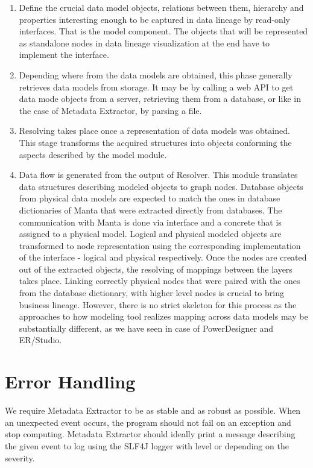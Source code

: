 \begin{enumerate}
	\item Define the crucial data model objects, relations between them, hierarchy and properties interesting enough to be captured in data lineage by read-only interfaces. That is the model component. 
	The objects that will be represented as standalone nodes in data lineage visualization at the end have to implement the  interface.
	\item Depending where from the data models are obtained, this phase generally retrieves data models from storage. It may be by calling a web API to get data mode objects from a server, retrieving them from a database, or like in the case of Metadata Extractor, by parsing a file.
	\item Resolving takes place once a representation of data models was obtained. This stage transforms the acquired structures into objects conforming the aspects described by the model module.
	\item Data flow is generated from the output of Resolver. This module translates data structures describing modeled objects to graph nodes. 
	Database objects from physical data models are expected to match the ones in database dictionaries of Manta that were extracted directly from databases. 
	The communication with Manta is done via  interface and a concrete  that is assigned to a physical model.
	Logical and physical modeled objects are transformed to node representation using the corresponding implementation of the  interface - logical and physical respectively.
	Once the nodes are created out of the extracted objects, the resolving of mappings between the layers takes place.
	Linking correctly physical nodes that were paired with the ones from the database dictionary, with higher level nodes is crucial to bring business lineage. 
	However, there is no strict skeleton for this process as the approaches to how modeling tool realizes mapping across data models may be substantially different, as we have seen in case of PowerDesigner and ER/Studio.
\end{enumerate} 

\section{Error Handling}

We require Metadata Extractor to be as stable and as robust as possible. 
When an unexpected event occurs, the program should not fail on an exception and stop computing. Metadata Extractor should ideally print a message describing the given event to log using the SLF4J logger with level  or  depending on the severity. 

